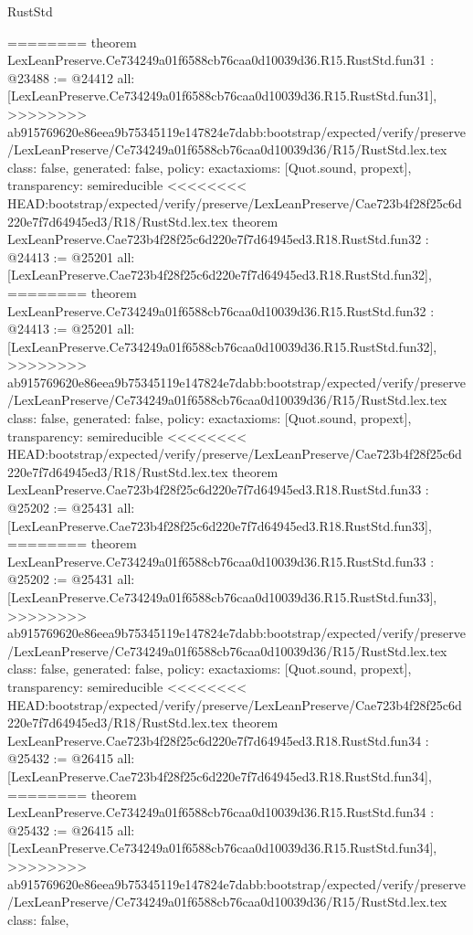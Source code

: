\begin{lexlean}{RustStd}
\begin{coremodule}
{\begin{coremodule}
{{{{{{{{{{{{{{{{{{{{{{{{{{{{{{{{{{========
theorem LexLeanPreserve.Ce734249a01f6588cb76caa0d10039d36.R15.RustStd.fun31 : @23488 := @24412 {
  all: [LexLeanPreserve.Ce734249a01f6588cb76caa0d10039d36.R15.RustStd.fun31],
>>>>>>>> ab915769620e86eea9b75345119e147824e7dabb:bootstrap/expected/verify/preserve/LexLeanPreserve/Ce734249a01f6588cb76caa0d10039d36/R15/RustStd.lex.tex
  class: false,
  generated: false,
  policy: exact{axioms: [Quot.sound, propext]},
  transparency: semireducible
}
<<<<<<<< HEAD:bootstrap/expected/verify/preserve/LexLeanPreserve/Cae723b4f28f25c6d220e7f7d64945ed3/R18/RustStd.lex.tex
theorem LexLeanPreserve.Cae723b4f28f25c6d220e7f7d64945ed3.R18.RustStd.fun32 : @24413 := @25201 {
  all: [LexLeanPreserve.Cae723b4f28f25c6d220e7f7d64945ed3.R18.RustStd.fun32],
========
theorem LexLeanPreserve.Ce734249a01f6588cb76caa0d10039d36.R15.RustStd.fun32 : @24413 := @25201 {
  all: [LexLeanPreserve.Ce734249a01f6588cb76caa0d10039d36.R15.RustStd.fun32],
>>>>>>>> ab915769620e86eea9b75345119e147824e7dabb:bootstrap/expected/verify/preserve/LexLeanPreserve/Ce734249a01f6588cb76caa0d10039d36/R15/RustStd.lex.tex
  class: false,
  generated: false,
  policy: exact{axioms: [Quot.sound, propext]},
  transparency: semireducible
}
<<<<<<<< HEAD:bootstrap/expected/verify/preserve/LexLeanPreserve/Cae723b4f28f25c6d220e7f7d64945ed3/R18/RustStd.lex.tex
theorem LexLeanPreserve.Cae723b4f28f25c6d220e7f7d64945ed3.R18.RustStd.fun33 : @25202 := @25431 {
  all: [LexLeanPreserve.Cae723b4f28f25c6d220e7f7d64945ed3.R18.RustStd.fun33],
========
theorem LexLeanPreserve.Ce734249a01f6588cb76caa0d10039d36.R15.RustStd.fun33 : @25202 := @25431 {
  all: [LexLeanPreserve.Ce734249a01f6588cb76caa0d10039d36.R15.RustStd.fun33],
>>>>>>>> ab915769620e86eea9b75345119e147824e7dabb:bootstrap/expected/verify/preserve/LexLeanPreserve/Ce734249a01f6588cb76caa0d10039d36/R15/RustStd.lex.tex
  class: false,
  generated: false,
  policy: exact{axioms: [Quot.sound, propext]},
  transparency: semireducible
}
<<<<<<<< HEAD:bootstrap/expected/verify/preserve/LexLeanPreserve/Cae723b4f28f25c6d220e7f7d64945ed3/R18/RustStd.lex.tex
theorem LexLeanPreserve.Cae723b4f28f25c6d220e7f7d64945ed3.R18.RustStd.fun34 : @25432 := @26415 {
  all: [LexLeanPreserve.Cae723b4f28f25c6d220e7f7d64945ed3.R18.RustStd.fun34],
========
theorem LexLeanPreserve.Ce734249a01f6588cb76caa0d10039d36.R15.RustStd.fun34 : @25432 := @26415 {
  all: [LexLeanPreserve.Ce734249a01f6588cb76caa0d10039d36.R15.RustStd.fun34],
>>>>>>>> ab915769620e86eea9b75345119e147824e7dabb:bootstrap/expected/verify/preserve/LexLeanPreserve/Ce734249a01f6588cb76caa0d10039d36/R15/RustStd.lex.tex
  class: false,
}}}}}}}}}}}}}}}}}}}}}}}}}}}}}}}}}}}}}}
\end{coremodule}}
\end{coremodule}
\end{lexlean}
